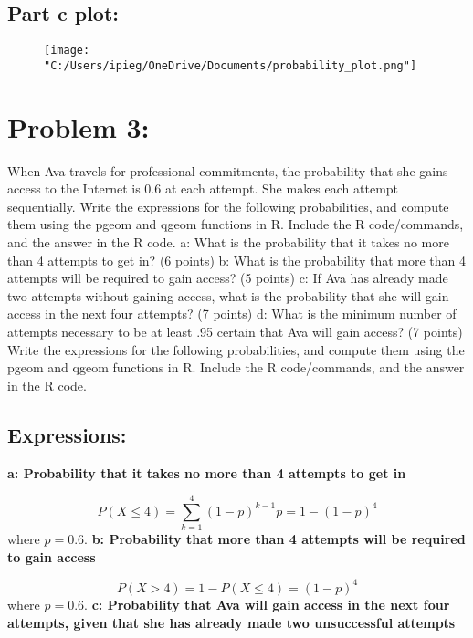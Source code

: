 \documentclass{article}
\begin{document}
\subsection{Part c plot:}
\begin{figure}[H]
    \centering
    \texttt{[image: "C:/Users/ipieg/OneDrive/Documents/probability\_plot.png"]}
    \label{fig:prob_plot}
\end{figure}

\section{Problem 3:}
When Ava travels for professional commitments, the probability that she gains access to
the Internet is 0.6 at each attempt. She makes each attempt sequentially. Write the
expressions for the following probabilities, and compute them using the pgeom and
qgeom functions in R. Include the R code/commands, and the answer in the R code.
a: What is the probability that it takes no more than 4 attempts to get in? (6 points)
b: What is the probability that more than 4 attempts will be required to gain access? (5
points)
c: If Ava has already made two attempts without gaining access, what is the probability
that she will gain access in the next four attempts? (7 points)
d: What is the minimum number of attempts necessary to be at least .95 certain that Ava
will gain access? (7 points)
Write the expressions for the following probabilities, and compute them using the pgeom
and qgeom functions in R. Include the R code/commands, and the answer in the R code. 

\subsection{Expressions:}
\textbf{a: Probability that it takes no more than 4 attempts to get in}

\[
P(X \leq 4) = \sum_{k=1}^{4} (1 - p)^{k-1} p = 1 - (1 - p)^4
\]
where \( p = 0.6 \).
\newline
\newline
\textbf{b: Probability that more than 4 attempts will be required to gain access}

\[
P(X > 4) = 1 - P(X \leq 4) = (1 - p)^4
\]
where \( p = 0.6 \).
\newline
\newline
\textbf{c: Probability that Ava will gain access in the next four attempts, given that she has already made two unsuccessful attempts}
\end{document}
